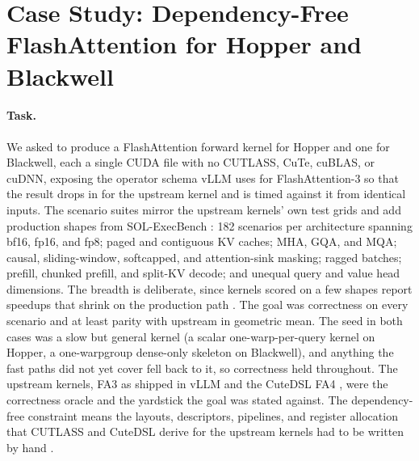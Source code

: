 \section{Case Study: Dependency-Free FlashAttention for Hopper and Blackwell}
\label{sec:kernels}

\paragraph{Task.} We asked \sys to produce a FlashAttention forward kernel for Hopper and one for
Blackwell, each a single CUDA file with no CUTLASS, CuTe, cuBLAS, or cuDNN, exposing the operator
schema vLLM uses for FlashAttention-3 so that the result drops in for the upstream kernel and is
timed against it from identical inputs. The scenario suites mirror the upstream kernels' own test
grids and add production shapes from SOL-ExecBench \cite{lin2026solexecbench}: 182 scenarios per
architecture spanning bf16, fp16, and fp8; paged and contiguous KV caches; MHA, GQA, and MQA; causal,
sliding-window, softcapped, and attention-sink masking; ragged batches; prefill, chunked prefill,
and split-KV decode; and unequal query and value head dimensions. The breadth is deliberate, since kernels scored on a few
shapes report speedups that shrink on the production path \cite{oliaro2026fastkernels}. The goal was correctness on every scenario and at least parity with upstream in geometric mean. The seed
in both cases was a slow but general kernel (a scalar one-warp-per-query kernel on Hopper, a
one-warpgroup dense-only skeleton on Blackwell), and anything the fast paths did not yet cover fell
back to it, so correctness held throughout. The upstream kernels, FA3 as shipped in vLLM and the
CuteDSL FA4 \cite{shah2024flashattention3,zadouri2026flashattention4}, were the correctness oracle
and the yardstick the goal was stated against. The dependency-free constraint means the layouts,
descriptors, pipelines, and register allocation that CUTLASS and CuteDSL derive for the upstream
kernels had to be written by hand \cite{nvidia2023cutlass}.

